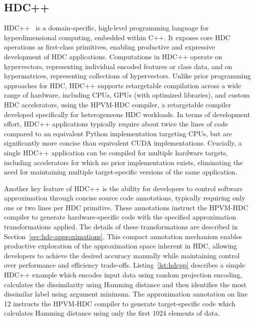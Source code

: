 \subsection{HDC++}
\label{bg:hdc++}

HDC++~\cite{hpvm-hdc} is a domain-specific, high-level programming language for hyperdimensional computing, embedded within C++. It exposes core HDC operations as first-class primitives, enabling productive and expressive development of HDC applications. Computations in HDC++ operate on hypervectors, representing individual encoded features or class data, and on hypermatrices, representing collections of hypervectors. Unlike prior programming approaches for HDC, HDC++ supports retargetable compilation across a wide range of hardware, including CPUs, GPUs (with optimized libraries), and custom HDC accelerators, using the HPVM-HDC compiler, a retargetable compiler developed specifically for heterogeneous HDC workloads. In terms of development effort, HDC++ applications typically require about twice the lines of code compared to an equivalent Python implementation targeting CPUs, but are significantly more concise than equivalent CUDA implementations. Crucially, a single HDC++ application can be compiled for multiple hardware targets, including accelerators for which no prior implementation exists, eliminating the need for maintaining multiple target-specific versions of the same application.

Another key feature of HDC++ is the ability for developers to control software approximation through concise source code annotations, typically requiring only one or two lines per HDC primitive. These annotations instruct the HPVM-HDC compiler to generate hardware-specific code with the specified approximation transformations applied. The details of these transformations are described in Section~\ref{sec:hdc-approximations}. This compact annotation mechanism enables productive exploration of the approximation space inherent in HDC, allowing developers to achieve the desired accuracy manually while maintaining control over performance and efficiency trade-offs. Listing~\ref{lst:hdcpp} describes a simple HDC++ example which encodes input data using random projection encoding, calculates the dissimilarity using Hamming distance and then identifies the most dissimilar label using argument minimum. The approximation annotation on line 12 instructs the HPVM-HDC compiler to generate target-specific code which calculates Hamming distance using only the first 1024 elements of data.

